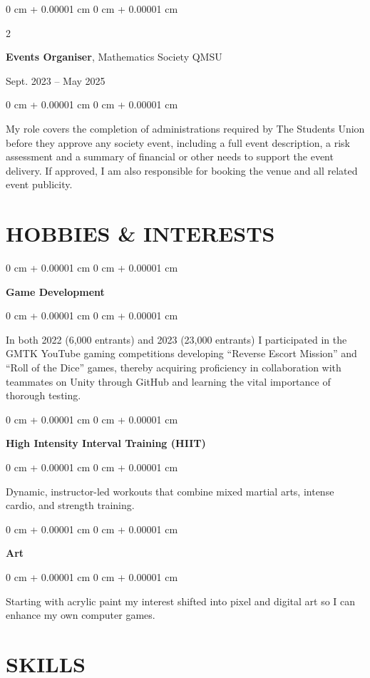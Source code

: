 \documentclass[10pt, letterpaper]{article}
\newenvironment{onecolentry}{
    \begin{adjustwidth}{
        0 cm + 0.00001 cm
    }{
        0 cm + 0.00001 cm
    }
}{
    \end{adjustwidth}
} %
\newenvironment{twocolentry}[2][]{
    \onecolentry
    \def\secondColumn{#2}
    \setcolumnwidth{\fill, 4.5 cm}
    \begin{paracol}{2}
}{
    \switchcolumn \raggedleft \secondColumn
    \end{paracol}
    \endonecolentry
} %
\begin{document}
        \vspace{0.2cm}
        \begin{twocolentry}{
            Sept. 2023 – May 2025
            }
            \textbf{Events Organiser}, Mathematics Society QMSU
        \end{twocolentry}
        \begin{onecolentry}
            My role covers the completion of administrations required by The Students Union before they approve any society event, including a full event description, a risk assessment and a summary of financial or other needs to support the event delivery. If approved, I am also responsible for booking the venue and all related event publicity. 
        \end{onecolentry}

    
    
    \section{HOBBIES \& INTERESTS}
        \begin{onecolentry}
            \textbf{Game Development}
        \end{onecolentry}
        \begin{onecolentry}
            In both 2022 (6,000 entrants) and 2023 (23,000 entrants) I participated in the GMTK YouTube gaming competitions developing “Reverse Escort Mission” and “Roll of the Dice” games, thereby acquiring proficiency in collaboration with teammates on Unity through GitHub and learning the vital importance of thorough testing.
        \end{onecolentry}

        \vspace{0.2cm}
        \begin{onecolentry}
            \textbf{High Intensity Interval Training (HIIT)} 
        \end{onecolentry}
        \begin{onecolentry}
            Dynamic, instructor-led workouts that combine mixed martial arts, intense cardio, and strength training.
        \end{onecolentry}
        
        \vspace{0.2 cm}
        \begin{onecolentry}
            \textbf{Art}
        \end{onecolentry}
        \begin{onecolentry}
            Starting with acrylic paint my interest shifted into pixel and digital art so I can enhance my own computer games.
        \end{onecolentry}


    
    \section{SKILLS}
        
\end{document}
